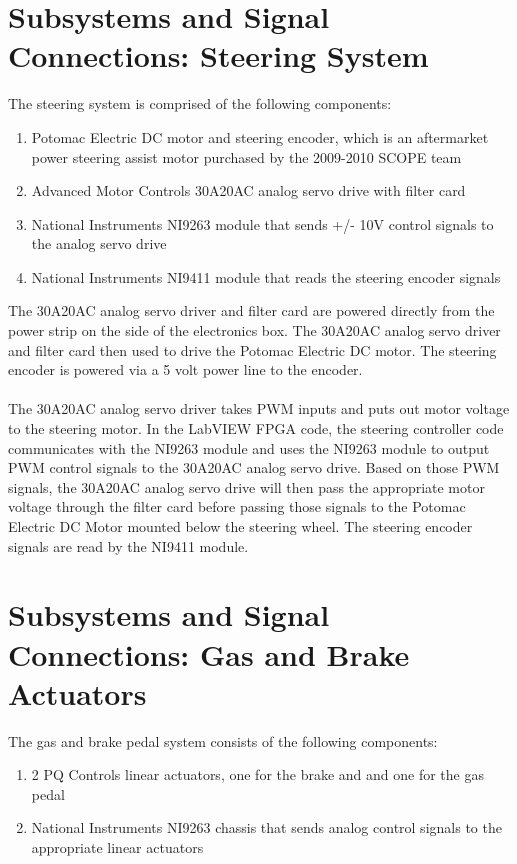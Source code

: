 \section{Subsystems and Signal Connections: Steering System}

The steering system is comprised of the following components:

\begin{enumerate}
\item Potomac Electric DC motor and steering encoder, which is an aftermarket power steering assist motor purchased by the 2009-2010 SCOPE team
\item Advanced Motor Controls 30A20AC analog servo drive with filter card
\item National Instruments NI9263 module that sends +/- 10V control signals to the analog servo drive
\item National Instruments NI9411 module that reads the steering encoder signals
\end{enumerate}

The 30A20AC analog servo driver and filter card are powered directly from the power strip on the side of the electronics box. The 30A20AC analog servo driver and filter card then used to drive the Potomac Electric DC motor. The steering encoder is powered via a 5 volt power line to the encoder.\\ \\
%
\noindent The 30A20AC analog servo driver takes PWM inputs and puts out motor voltage to the steering motor. In the LabVIEW FPGA code, the steering controller code communicates with the NI9263 module and uses the NI9263 module to output PWM control signals to the 30A20AC analog servo drive. Based on those PWM signals, the 30A20AC analog servo drive will then pass the appropriate motor voltage through the filter card before passing those signals to the Potomac Electric DC Motor mounted below the steering wheel. The steering encoder signals are read by the NI9411 module.

\section{Subsystems and Signal Connections: Gas and Brake Actuators}

The gas and brake pedal system consists of the following components:

\begin{enumerate}
\item 2 PQ Controls linear actuators, one for the brake and and one for the gas pedal
\item National Instruments NI9263 chassis that sends analog control signals to the appropriate linear actuators
\end{enumerate}

